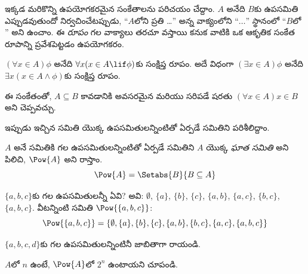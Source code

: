 \documentclass[../../../include/open-logic-section]{subfiles}
\begin{document}
ఇక్కడ మరికొన్ని ఉపయోగకరమైన సంకేతాలను పరిచయం చేద్దాం.
$A$ అనేది $B$కు ఉపసమితి ఎప్పుడవుతుందో నిర్వచించేటప్పుడు,
``$A$లోని ప్రతి  \dots'' అన్న వాక్యంలోని
``$\dots$'' స్థానంలో ``$B$లో '' అని ఉంచాం.
ఈ \emph{రూపం} గల వాక్యాలు తరచూ వస్తాయి కనుక వాటికి
ఒక ఆకృతిక సంకేత రూపాన్ని ప్రవేశపెట్టడం ఉపయోగకరం.

\begin{defn}
$(\forall x \in A)\phi$ అనేది $\forall x(x \in A \lif
\phi)$కు సంక్షిప్త రూపం. అదే విధంగా $(\exists x \in A)\phi$
అనేది $\exists x(x \in A \land \phi)$కు సంక్షిప్త రూపం.
\end{defn}

ఈ సంకేతంతో, $A \subseteq B$ కావడానికి అవసరమైన మరియు సరిపడే
షరతు $(\forall x \in A)x \in B$ అని చెప్పవచ్చు.

ఇప్పుడు ఇచ్చిన సమితి యొక్క ఉపసమితులన్నింటితో ఏర్పడే సమితిని పరిశీలిద్దాం.

\begin{defn}[ఘాత సమితి]
$A$ అనే సమితికి గల ఉపసమితులన్నింటితో ఏర్పడే సమితిని
$A$ యొక్క \emph{ఘాత సమితి} అని పిలిచి, $\Pow{A}$ అని రాస్తాం.
  \[
    \Pow{A} = \Setabs{B}{B \subseteq A}
  \]
\end{defn}

\begin{ex}
$\{ a, b, c \}$కు గల ఉపసమితులన్నీ ఏవి? అవి:
$\emptyset$, $\{a \}$, $\{b\}$, $\{c\}$, $\{a, b\}$, $\{a, c\}$,
$\{b, c\}$, $\{a, b, c\}$. వీటన్నింటి సమితి
$\Pow{\{a,b,c\}}$:
\[
\Pow{\{ a, b, c \}} = \{\emptyset, \{a \}, \{b\}, \{c\}, \{a, b\},
\{b, c\}, \{a, c\}, \{a, b, c\}\}
\]
\end{ex}

\begin{prob}
$\{a, b, c, d\}$కు గల ఉపసమితులన్నింటినీ జాబితాగా రాయండి.
\end{prob}

\begin{prob}
$A$లో $n$  ఉంటే, $\Pow{A}$లో $2^n$ 
ఉంటాయని చూపండి.
\end{prob}
\end{document}
